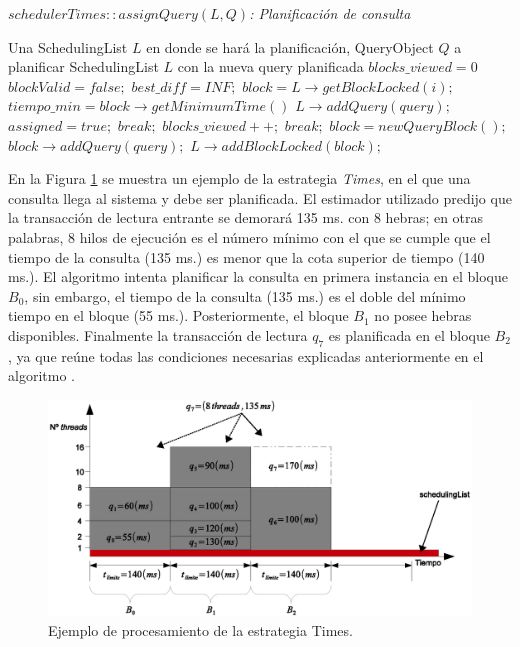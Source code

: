 \begin{algorithm}[!th]
\caption{\em $schedulerTimes::assignQuery(L, Q)$: Planificación de consulta}
\label{alg:times}
\begin{algorithmic}[1]
\REQUIRE Una SchedulingList $L$ en donde se hará la planificación, QueryObject $Q$ a planificar
\ENSURE SchedulingList $L$ con la nueva query planificada	
	\STATE $blocks\_viewed = 0$
	\STATE $blockValid = false;$	
	\STATE $best\_diff = INF;$	
		\STATE $block = L \rightarrow getBlockLocked(i);$		
			\STATE $tiempo\_min = block \rightarrow getMinimumTime()$			
				\STATE $L \rightarrow addQuery(query);$
				\STATE $assigned = true;$
				\STATE $break;$
			\ENDIF						
			\STATE $blocks\_viewed++;$			
				\STATE $break;$
			\ENDIF			
		\ENDIF		
	\ENDFOR	
		\STATE $block = new QueryBlock();$
		\STATE $block \rightarrow addQuery(query);$
		\STATE $L \rightarrow addBlockLocked(block);$		
	\ENDIF	
\end{algorithmic}
\end{algorithm}

En la Figura \ref{fig:proceso_Times} se muestra un ejemplo de la estrategia \textit{Times}, en el que una consulta llega al sistema y debe ser planificada. El estimador utilizado predijo que la transacción de lectura entrante se demorará 135 ms. con 8 hebras; en otras palabras, 8 hilos de ejecución es el número mínimo con el que se cumple que el tiempo de la consulta (135 ms.) es menor que la cota superior de tiempo (140 ms.). El algoritmo intenta planificar la consulta en primera instancia en el bloque $B_0$, sin embargo, el tiempo de la consulta (135 ms.) es el doble del mínimo tiempo en el bloque (55 ms.). Posteriormente, el bloque $B_1$ no posee hebras disponibles. Finalmente la transacción de lectura $q_7$ es planificada en el bloque $B_2$, ya que reúne todas las condiciones necesarias explicadas anteriormente en el algoritmo \label{alg:times}. 

\begin{figure}[!th]
\centering
\includegraphics[scale=.75]{images/proceso_Times.eps}
\caption{Ejemplo de procesamiento de la estrategia Times.}
\label{fig:proceso_Times}
\end{figure} 

